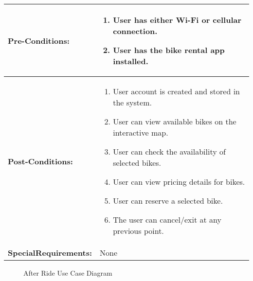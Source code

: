 \begin{longtable}{|p{3cm}|p{3cm}|p{3cm}|p{3cm}|}
\hline
\textbf{Pre-Conditions:} & \multicolumn{3}{p{9cm}|}{
    \begin{enumerate}[topsep=0pt,itemsep=0pt,parsep=0pt,partopsep=0pt,leftmargin=12pt]
        \item User has either Wi-Fi or cellular connection.
        \item User has the bike rental app installed.
    \end{enumerate}
}\\
\hline
\textbf{Post-Conditions:} & \multicolumn{3}{p{9cm}|}{
    \begin{enumerate}[topsep=0pt,itemsep=0pt,parsep=0pt,partopsep=0pt,leftmargin=12pt]
        \item User account is created and stored in the system.
        \item User can view available bikes on the interactive map.
        \item User can check the availability of selected bikes.
        \item User can view pricing details for bikes.
        \item User can reserve a selected bike.
        \item The user can cancel/exit at any previous point. 
    \end{enumerate}
}\\
\hline
\textbf{Special\newline Requirements:} & \multicolumn{3}{l|}{None}\\
\hline
\end{longtable}

\begin{figure}[H]
\centering
{}
\caption{\label{Figure::UCDiagram::AfterRiding} After Ride Use Case  Diagram}
\end{figure}


